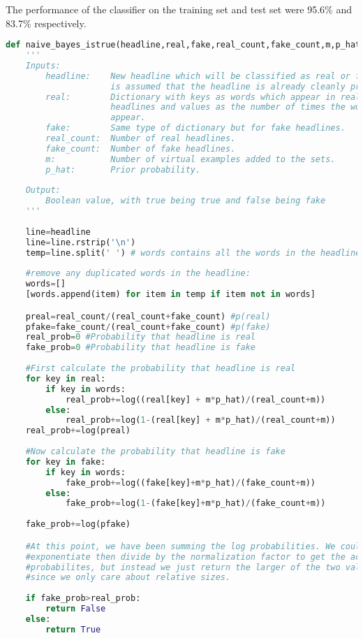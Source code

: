 \documentclass{article}
\theoremstyle{mytheor}
\theoremstyle{definition}
\begin{document}
The performance of the classifier on the training set and test set were 95.6\% and 83.7\% respectively.\\
\begin{lstlisting}[language=Python, caption=Naive Bayes Classifier]
def naive_bayes_istrue(headline,real,fake,real_count,fake_count,m,p_hat):
    '''
    Inputs:
        headline:    New headline which will be classified as real or fake. It 
                     is assumed that the headline is already cleanly processed.
        real:        Dictionary with keys as words which appear in real  
                     headlines and values as the number of times the words 
                     appear.
        fake:        Same type of dictionary but for fake headlines.
        real_count:  Number of real headlines.
        fake_count:  Number of fake headlines.
        m:           Number of virtual examples added to the sets.
        p_hat:       Prior probability. 
        
    Output:
        Boolean value, with true being true and false being fake
    '''
    
    line=headline
    line=line.rstrip('\n')
    temp=line.split(' ') # words contains all the words in the headline
    
    #remove any duplicated words in the headline:
    words=[]
    [words.append(item) for item in temp if item not in words]

    preal=real_count/(real_count+fake_count) #p(real)
    pfake=fake_count/(real_count+fake_count) #p(fake)
    real_prob=0 #Probability that headline is real
    fake_prob=0 #Probability that headline is fake
    
    #First calculate the probability that headline is real
    for key in real:
        if key in words:
            real_prob+=log((real[key] + m*p_hat)/(real_count+m))
        else:
            real_prob+=log(1-(real[key] + m*p_hat)/(real_count+m))
    real_prob+=log(preal)
    
    #Now calculate the probability that headline is fake
    for key in fake:
        if key in words:
            fake_prob+=log((fake[key]+m*p_hat)/(fake_count+m))
        else:
            fake_prob+=log(1-(fake[key]+m*p_hat)/(fake_count+m))
    
    fake_prob+=log(pfake)

    #At this point, we have been summing the log probabilities. We could 
    #exponentiate then divide by the normalization factor to get the actual
    #probabilites, but instead we just return the larger of the two values 
    #since we only care about relative sizes.
    
    if fake_prob>real_prob:
        return False
    else:
        return True
\end{lstlisting}
\end{document}

